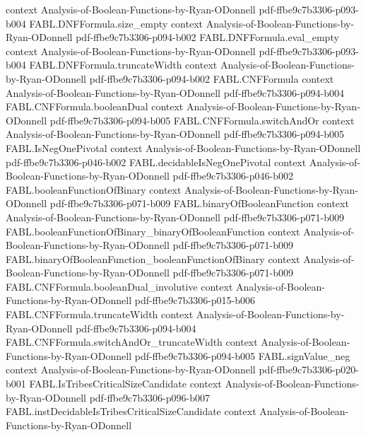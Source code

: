 \begin{theorem}
  {context}
  {Analysis-of-Boolean-Functions-by-Ryan-ODonnell}
  {pdf-ffbe9c7b3306-p093-b004}
\proofstep
  {FABL.DNFFormula.size_empty}
  {context}
  {Analysis-of-Boolean-Functions-by-Ryan-ODonnell}
  {pdf-ffbe9c7b3306-p094-b002}
\proofstep
  {FABL.DNFFormula.eval_empty}
  {context}
  {Analysis-of-Boolean-Functions-by-Ryan-ODonnell}
  {pdf-ffbe9c7b3306-p093-b004}
\proofstep
  {FABL.DNFFormula.truncateWidth}
  {context}
  {Analysis-of-Boolean-Functions-by-Ryan-ODonnell}
  {pdf-ffbe9c7b3306-p094-b002}
\proofstep
  {FABL.CNFFormula}
  {context}
  {Analysis-of-Boolean-Functions-by-Ryan-ODonnell}
  {pdf-ffbe9c7b3306-p094-b004}
\proofstep
  {FABL.CNFFormula.booleanDual}
  {context}
  {Analysis-of-Boolean-Functions-by-Ryan-ODonnell}
  {pdf-ffbe9c7b3306-p094-b005}
\proofstep
  {FABL.CNFFormula.switchAndOr}
  {context}
  {Analysis-of-Boolean-Functions-by-Ryan-ODonnell}
  {pdf-ffbe9c7b3306-p094-b005}
\proofstep
  {FABL.IsNegOnePivotal}
  {context}
  {Analysis-of-Boolean-Functions-by-Ryan-ODonnell}
  {pdf-ffbe9c7b3306-p046-b002}
\proofstep
  {FABL.decidableIsNegOnePivotal}
  {context}
  {Analysis-of-Boolean-Functions-by-Ryan-ODonnell}
  {pdf-ffbe9c7b3306-p046-b002}
\proofstep
  {FABL.booleanFunctionOfBinary}
  {context}
  {Analysis-of-Boolean-Functions-by-Ryan-ODonnell}
  {pdf-ffbe9c7b3306-p071-b009}
\proofstep
  {FABL.binaryOfBooleanFunction}
  {context}
  {Analysis-of-Boolean-Functions-by-Ryan-ODonnell}
  {pdf-ffbe9c7b3306-p071-b009}
\proofstep
  {FABL.booleanFunctionOfBinary_binaryOfBooleanFunction}
  {context}
  {Analysis-of-Boolean-Functions-by-Ryan-ODonnell}
  {pdf-ffbe9c7b3306-p071-b009}
\proofstep
  {FABL.binaryOfBooleanFunction_booleanFunctionOfBinary}
  {context}
  {Analysis-of-Boolean-Functions-by-Ryan-ODonnell}
  {pdf-ffbe9c7b3306-p071-b009}
\proofstep
  {FABL.CNFFormula.booleanDual_involutive}
  {context}
  {Analysis-of-Boolean-Functions-by-Ryan-ODonnell}
  {pdf-ffbe9c7b3306-p015-b006}
\proofstep
  {FABL.CNFFormula.truncateWidth}
  {context}
  {Analysis-of-Boolean-Functions-by-Ryan-ODonnell}
  {pdf-ffbe9c7b3306-p094-b004}
\proofstep
  {FABL.CNFFormula.switchAndOr_truncateWidth}
  {context}
  {Analysis-of-Boolean-Functions-by-Ryan-ODonnell}
  {pdf-ffbe9c7b3306-p094-b005}
\proofstep
  {FABL.signValue_neg}
  {context}
  {Analysis-of-Boolean-Functions-by-Ryan-ODonnell}
  {pdf-ffbe9c7b3306-p020-b001}
\proofstep
  {FABL.IsTribesCriticalSizeCandidate}
  {context}
  {Analysis-of-Boolean-Functions-by-Ryan-ODonnell}
  {pdf-ffbe9c7b3306-p096-b007}
\proofstep
  {FABL.instDecidableIsTribesCriticalSizeCandidate}
  {context}
  {Analysis-of-Boolean-Functions-by-Ryan-ODonnell}

\end{theorem}
